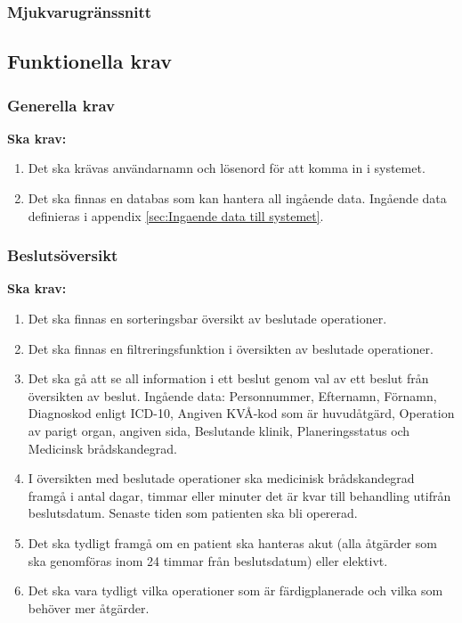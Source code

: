 \documentclass{article}
\begin{document}
\begin{enumerate}
\subsubsection{Mjukvarugränssnitt}
\label{subsec:EG-Mjukvarugranssnitt}

\subsection{Funktionella krav}
\label{subsec:Funktionella krav}
\subsubsection{Generella krav}
\label{subsec:Generella krav}
\textbf{Ska krav: }
\begin{enumerate}
    \item Det ska krävas användarnamn och lösenord för att komma in i systemet.
    \item Det ska finnas en databas som kan hantera all ingående data. Ingående data definieras i appendix \ref{sec:Ingaende data till systemet}.
\end{enumerate}

\subsubsection{Beslutsöversikt}
\textbf{Ska krav: }
\begin{enumerate}
  \item Det ska finnas en sorteringsbar översikt av beslutade operationer.
  \item Det ska finnas en filtreringsfunktion i översikten av beslutade
  operationer.
  \item Det ska gå att se all information i ett beslut genom val av ett
  beslut från översikten av beslut.
  Ingående data:
  Personnummer, Efternamn, Förnamn, Diagnoskod enligt ICD-10, Angiven KVÅ-kod
  som är huvudåtgärd, Operation av parigt organ, angiven sida, Beslutande
  klinik, Planeringsstatus och Medicinsk brådskandegrad.
  \item I översikten med beslutade operationer ska medicinisk brådskandegrad
  framgå i antal dagar, timmar eller minuter det är kvar till behandling utifrån
  beslutsdatum. Senaste tiden som patienten ska bli opererad.
  \item Det ska tydligt framgå om en patient ska hanteras akut (alla åtgärder
  som ska genomföras inom 24 timmar från beslutsdatum) eller elektivt.
  \item Det ska vara tydligt vilka operationer som är färdigplanerade och vilka
  som behöver mer åtgärder.
\end{enumerate}

\end{enumerate}
\end{document}
